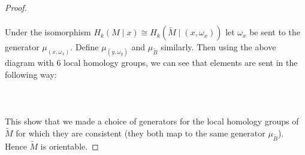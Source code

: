 \documentclass[a4paper]{article}
\begin{document}
\begin{lmm}{}{}
\begin{proof}
\\~\\
Under the isomorphism $H_k(M\;|\;x)\cong H_k(\widetilde{M}\;|\;(x,\omega_x))$ let $\omega_x$ be sent to the generator $\mu_{(x,\omega_x)}$. Define $\mu_{(y,\omega_y)}$ and $\mu_{\widetilde{B}}$ similarly. Then using the above diagram with 6 local homology groups, we can see that elements are sent in the following way: \\~\\
\\~\\
This show that we made a choice of generators for the local homology groups of $\widetilde{M}$ for which they are consistent (they both map to the same generator $\mu_{\widetilde{B}}$). Hence $\widetilde{M}$ is orientable. 
\end{proof}
\end{lmm}
\end{document}
